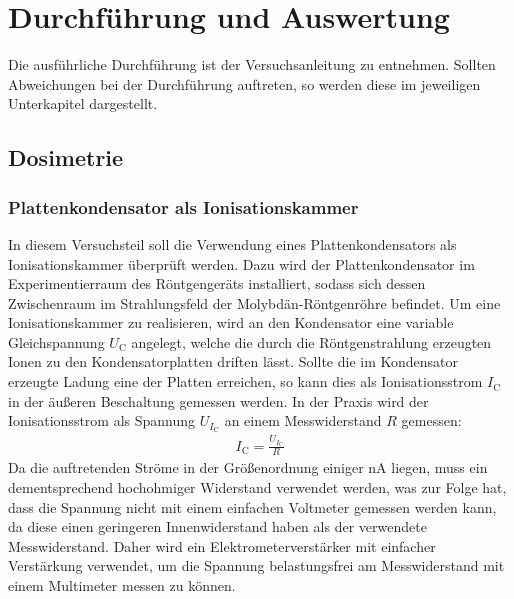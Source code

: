 \documentclass[11pt, a4paper]{article}
\numberwithin{equation}{section}
\begin{document}
\section{Durchführung und Auswertung}
Die ausführliche Durchführung ist der Versuchsanleitung \cite{anleitung} zu entnehmen.
Sollten Abweichungen bei der Durchführung auftreten, so werden diese im jeweiligen Unterkapitel dargestellt.

\subsection{Dosimetrie}

\subsubsection{Plattenkondensator als Ionisationskammer}
In diesem Versuchsteil soll die Verwendung eines Plattenkondensators als Ionisationskammer überprüft werden.
Dazu wird der Plattenkondensator im Experimentierraum des Röntgengeräts installiert, sodass sich dessen Zwischenraum im Strahlungsfeld der Molybdän-Röntgenröhre befindet.
Um eine Ionisationskammer zu realisieren, wird an den Kondensator eine variable Gleichspannung $U_\mathrm{C}$ angelegt, welche die durch die Röntgenstrahlung erzeugten Ionen zu den Kondensatorplatten driften lässt.
Sollte die im Kondensator erzeugte Ladung eine der Platten erreichen, so kann dies als Ionisationsstrom $I_\mathrm{C}$ in der äußeren Beschaltung gemessen werden.
In der Praxis wird der Ionisationsstrom als Spannung $U_{I_\mathrm{C}}$ an einem Messwiderstand $R$ gemessen:
\begin{align}
	I_\mathrm{C} = \frac{U_{I_\mathrm{C}}}{R}
	\label{eq:ohm_ionisationsstrom}
\end{align}
Da die auftretenden Ströme in der Größenordnung einiger \si{nA} liegen, muss ein dementsprechend hochohmiger Widerstand verwendet werden, was zur Folge hat, dass die Spannung nicht mit einem einfachen Voltmeter gemessen werden kann, da diese einen geringeren Innenwiderstand haben als der verwendete Messwiderstand.
Daher wird ein Elektrometerverstärker mit einfacher Verstärkung verwendet, um die Spannung belastungsfrei am Messwiderstand mit einem Multimeter messen zu können.
\end{document}
